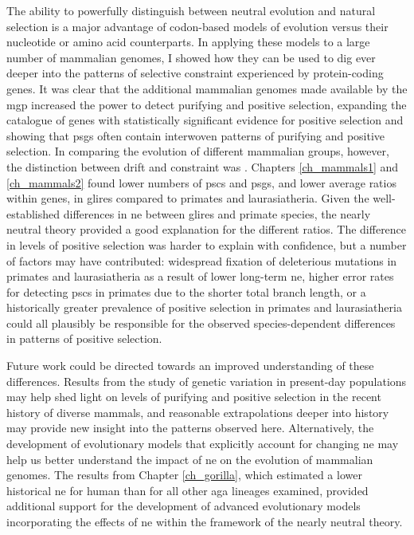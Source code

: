 The ability to powerfully distinguish between neutral evolution and
natural selection is a major advantage of codon-based models of
evolution versus their nucleotide or amino acid counterparts. In
applying these models to a large number of mammalian genomes, I showed
how they can be used to dig ever deeper into the patterns of selective
constraint experienced by protein-coding genes. It was clear that the
additional mammalian genomes made available by the \ac{mgp} increased
the power to detect purifying and positive selection, expanding the
catalogue of genes with statistically significant evidence for
positive selection and showing that \acp{psg} often contain interwoven
patterns of purifying and positive selection. In comparing the
evolution of different mammalian groups, however, the distinction
between drift and constraint was . Chapters
\ref{ch_mammals1} and \ref{ch_mammals2} found lower numbers of
\acp{psc} and \acp{psg}, and lower average \dnds ratios within genes,
in glires compared to primates and laurasiatheria. Given the
well-established differences in \ac{ne} between glires and primate
species, the nearly neutral theory provided a good explanation for the
different \dnds ratios. The difference in levels of positive selection
was harder to explain with confidence, but a number of factors may
have contributed: widespread fixation of deleterious mutations in
primates and laurasiatheria as a result of lower long-term \ac{ne},
higher error rates for detecting \acp{psc} in primates due to the
shorter total branch length, or a historically greater prevalence of
positive selection in primates and laurasiatheria could all plausibly
be responsible for the observed species-dependent differences in
patterns of positive selection.

Future work could be directed towards an improved understanding of
these differences. Results from the study of genetic variation in
present-day populations may help shed light on levels of purifying and
positive selection in the recent history of diverse mammals, and
reasonable extrapolations deeper into history may provide new insight
into the patterns observed here. Alternatively, the development of
evolutionary models that explicitly account for changing \ac{ne} may
help us better understand the impact of \ac{ne} on the evolution of
mammalian genomes. The results from Chapter \ref{ch_gorilla}, which
estimated a lower historical \ac{ne} for human than for all other
\ac{aga} lineages examined, provided additional support for the
development of advanced evolutionary models incorporating the effects
of \ac{ne} within the framework of the nearly neutral theory.

